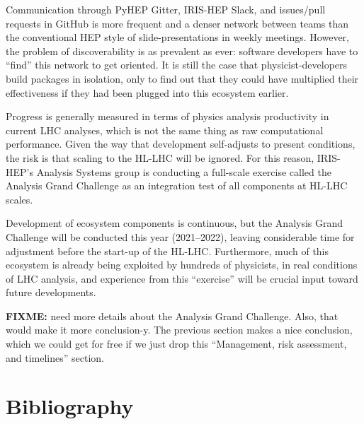 \documentclass{article}
\begin{document}
Communication through PyHEP Gitter, IRIS-HEP Slack, and issues/pull requests in GitHub is more frequent and a denser network between teams than the conventional HEP style of slide-presentations in weekly meetings. However, the problem of discoverability is as prevalent as ever: software developers have to ``find'' this network to get oriented. It is still the case that physicist-developers build packages in isolation, only to find out that they could have multiplied their effectiveness if they had been plugged into this ecosystem earlier.

Progress is generally measured in terms of physics analysis productivity in current LHC analyses, which is not the same thing as raw computational performance. Given the way that development self-adjusts to present conditions, the risk is that scaling to the HL-LHC will be ignored. For this reason, IRIS-HEP's Analysis Systems group is conducting a full-scale exercise called the Analysis Grand Challenge as an integration test of all components at HL-LHC scales.

Development of ecosystem components is continuous, but the Analysis Grand Challenge will be conducted this year (2021--2022), leaving considerable time for adjustment before the start-up of the HL-LHC. Furthermore, much of this ecosystem is already being exploited by hundreds of physicists, in real conditions of LHC analysis, and experience from this ``exercise'' will be crucial input toward future developments.

{\bf FIXME:} need more details about the Analysis Grand Challenge. Also, that would make it more conclusion-y. The previous section makes a nice conclusion, which we could get for free if we just drop this ``Management, risk assessment, and timelines'' section.

\section{Bibliography}

%
\end{document}
